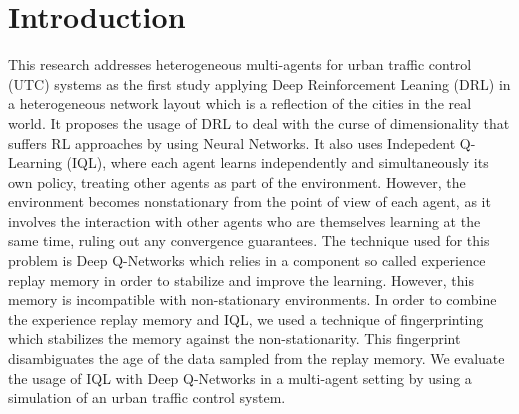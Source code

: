 \documentclass{llncs}
\begin{document}
\begin{abstract}
\end{abstract}

\section{Introduction}

This research addresses heterogeneous multi-agents for  urban traffic control (UTC) systems as the first study applying Deep Reinforcement Leaning (DRL) in a heterogeneous network layout which is a reflection of the cities in the real world. It proposes the usage of DRL to deal with the curse of dimensionality that suffers RL approaches by using Neural Networks. It also uses Indepedent Q-Learning (IQL), where each agent learns independently and simultaneously its own policy, treating other agents as part of the environment. However, the environment becomes nonstationary from the point of view of each agent, as it involves the interaction with other agents who are themselves learning at the same time, ruling out any convergence guarantees. The technique used for this problem is Deep Q-Networks which relies in a component so called experience replay memory in order to stabilize and improve the learning. However, this memory is incompatible with non-stationary environments. In order to combine the experience replay memory and IQL, we used a technique of fingerprinting which stabilizes the memory against the non-stationarity. This fingerprint disambiguates the age of the data sampled from the replay memory. We evaluate the usage of IQL with Deep Q-Networks in a multi-agent setting by using a simulation of an urban traffic control system.
\end{document}
